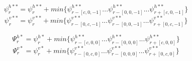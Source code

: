 	\begin{equation} \label{eq:optimal_cuts3}
		 \psi_{r}^{h**} =\psi_{r}^{h**} +  min\{\psi_{r-[c,0,-1]}^{h**}... \psi_{r-[0,0,-1]}^{h**} ... \psi_{r+[c,0,-1]}^{h**} \} 
	\end{equation} 
	\begin{equation} \label{eq:optimal_cuts4}
		 \psi_{r}^{v**} = \psi_{r}^{v**} +  min\{\psi_{r-[0,c,-1]}^{v**}... \psi_{r-[0,0,-1]}^{v**} ... \psi_{r+[0,c,-1]}^{v**} \} 
	\end{equation} 
	
	
	\begin{equation} \label{eq:optimal_cuts1}						
		 \Psi_{r}^{h*} = \psi_{r}^{h*}  + min\{\psi_{r-[c,0,0]}^{h**}... \psi_{r-[0,0,0]}^{h**} ... \psi_{r+[c,0,0]}^{h**} \} 
	\end{equation} 
	\begin{equation} \label{eq:optimal_cuts2}
		 \Psi_{r}^{v*} = \psi_{r}^{v*}  + min\{\psi_{r-[0,c,0]}^{v**}... \psi_{r-[0,0,0]}^{v**} ... \psi_{r+[0,c,0]}^{v**} \} 
	\end{equation} 

					
				

						
		
